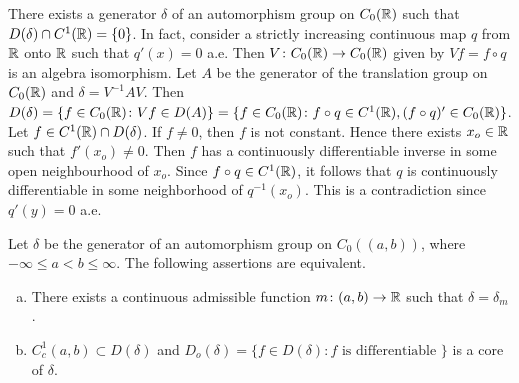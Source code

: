 \begin{example}\label{ex:b2-3.22}
There exists a generator $\delta$ of an automorphism group on $C_{0}(\mathbb{R})$ such that $D(\delta) \cap C^{1}(\mathbb{R}) = \{0\}$.
In fact, consider a strictly increasing continuous map $q$ from $\mathbb{R}$ onto $\mathbb{R}$ such that
$q'(x) = 0$ a.e.
Then $V \colon C_{0}(\mathbb{R}) \to C_{0}(\mathbb{R})$ given by $Vf = f \circ q$ is an algebra isomorphism.
Let $A$ be the generator of the translation group on $C_{0}(\mathbb{R})$ and $\delta = V^{-1}AV$.
Then $D(\delta) = \{ f \in C_{0}(\mathbb{R}) \colon Vf \in D(A)\} = \{f \in C_{0}(\mathbb{R}) \colon f \circ q \in C^{1}(\mathbb{R}), (f \circ q)' \in C_{0}(\mathbb{R}) \}$.
Let $f \in C^{1}(\mathbb{R}) \cap D(\delta)$.
If $f \neq 0$, then $f$ is not constant.
Hence there exists $x_{o} \in \mathbb{R}$ such that $f'(x_{o}) \neq 0$.
Then $f$ has a continuously differentiable inverse in some open neighbourhood of $x_{o}$.
Since $f \circ q \in C^{1}(\mathbb{R})$, it follows that $q$ is continuously differentiable in some neighborhood of $q^{-1}(x_{o})$.
This is a contradiction since $q'(y) = 0$ a.e.
\end{example}
\begin{theorem}\label{thm:b2-3.23}
Let $\delta$ be the generator of an automorphism group on $C_{0}((a,b))$, where $-\infty \leq a < b \leq \infty$.
The following assertions are equivalent.
\begin{enumerate}[(a)]
\item \label{thm:b2-3.23-1} 
There exists a continuous admissible function $m \colon (a,b) \to \mathbb{R}$ such that $\delta = \delta_{m}$.
\item \label{thm:b2-3.23-2}
$C_{c}^{1}(a,b) \subset D(\delta)$ and $D_{o}(\delta) = \{ f \in D(\delta) \colon f \text{ is differentiable } \}$ is a core of $\delta$.
\end{enumerate}
\end{theorem}

